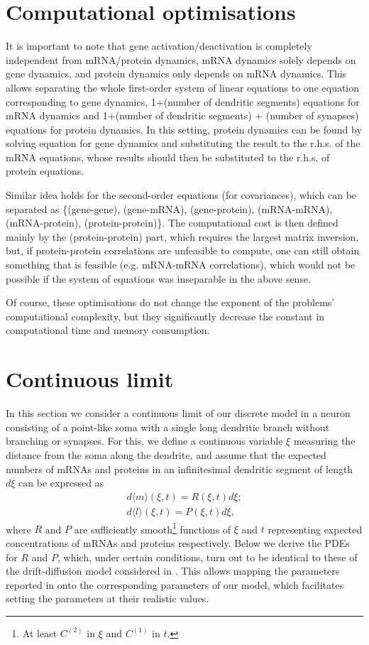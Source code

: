 \documentclass[a4paper, 11pt]{article}
\begin{document}
\appendix \label{app:Computational_optimisations}


\section{Computational optimisations}
It is important to note that gene activation/deactivation is completely independent from mRNA/protein dynamics, mRNA dynamics solely depends on gene dynamics, and protein dynamics only depends on mRNA dynamics. This allows separating the whole first-order system of linear equations to one equation corresponding to gene dynamics, 1+(number of dendritic segments) equations for mRNA dynamics and 1+(number of dendritic segments) + (number of synapses) equations for protein dynamics. In this setting, protein dynamics can be found by solving equation for gene dynamics and substituting the result to the r.h.s. of the mRNA equations, whose results should then be substituted to the r.h.s. of protein equations.

Similar idea holds for the second-order equations (for covariances), which can be separated as \{(gene-gene), (gene-mRNA), (gene-protein), (mRNA-mRNA), (mRNA-protein), (protein-protein)\}. The computational cost is then defined mainly by the (protein-protein) part, which requires the largest matrix inversion, but, if protein-protein correlations are unfeasible to compute, one can still obtain something that is feasible (e.g. mRNA-mRNA correlations), which would not be possible if the system of equations was inseparable in the above sense.

Of course, these optimisations do not change the exponent of the problems' computational complexity, but they significantly decrease the constant in computational time and memory consumption.

\appendix \label{app:DDM_correspondence}
\section{Continuous limit}
In this section we consider a continuous limit of our discrete model in a neuron consisting of a point-like soma with a single long dendritic branch without branching or synapses. For this, we define a continuous variable $\xi$ measuring the distance from the soma along the dendrite, and assume that the expected numbers of mRNAs and proteins in an infinitesimal dendritic segment of length $d\xi$ can be expressed as
\begin{align*}
  d\langle m\rangle (\xi,t) = R(\xi,t)d\xi;\\
  d\langle l\rangle (\xi,t) = P(\xi,t)d\xi,
\end{align*}
where $R$ and $P$ are sufficiently smooth\footnote{At least $C^{(2)}$ in $\xi$ and $C^{(1)}$ in $t$.} functions of $\xi$ and $t$ representing expected concentrations of mRNAs and proteins respectively. Below we derive the PDEs for $R$ and $P$, which, under certain conditions, turn out to be identical to these of the drift-diffusion model considered in \cite{PMID:31350097}. This allows mapping the parameters reported in \cite{PMID:31350097} onto the corresponding parameters of our model, which facilitates setting the parameters at their realistic values.
\end{document}
